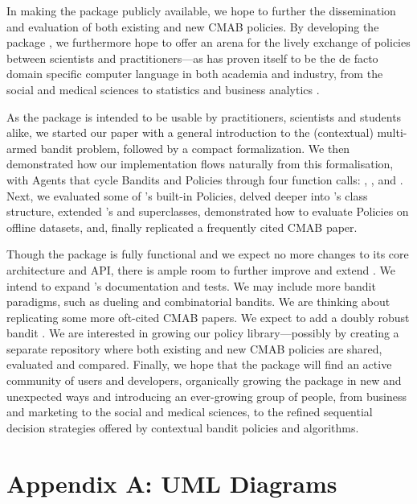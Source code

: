 \documentclass{jss}
\begin{document}
In making the package publicly available, we hope to further the dissemination and evaluation of both existing and new CMAB policies. By developing the package , we furthermore hope to offer an arena for the lively exchange of policies between scientists and practitioners---as  has proven itself to be the de facto domain specific computer language in both academia and industry, from the social and medical sciences to statistics and business analytics \citep{Tippmann2015}.

As the package is intended to be usable by practitioners, scientists and students alike, we started our paper with a general introduction to the (contextual) multi-armed bandit problem, followed by a compact formalization. We then demonstrated how our implementation flows naturally from this formalisation, with Agents that cycle Bandits and Policies through four function calls: , ,  and . Next, we evaluated some of 's built-in Policies, delved deeper into 's class structure, extended 's  and  superclasses, demonstrated how to evaluate Policies on offline datasets, and, finally replicated a frequently cited CMAB paper.

Though the package is fully functional and we expect no more changes to its core architecture and API, there is ample room to further improve and extend . We intend to expand 's documentation and tests. We may include more bandit paradigms, such as dueling and combinatorial bandits. We are thinking about replicating some more oft-cited CMAB papers. We expect to add a doubly robust bandit \citep{Dudik2011}. We are interested in growing our policy library---possibly by creating a separate repository where both existing and new CMAB policies are shared, evaluated and compared. Finally, we hope that the package will find an active community of users and developers, organically growing the package in new and unexpected ways and introducing an ever-growing group of people, from business and marketing to the social and medical sciences, to the refined sequential decision strategies offered by contextual bandit policies and algorithms.


%


\newpage

\section{Appendix A: UML Diagrams} \label{uml}
\end{document}
